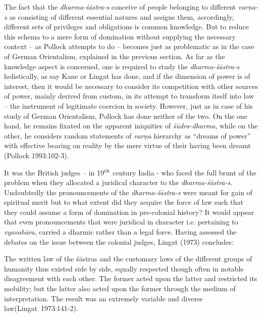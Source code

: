 The fact that the {\sl dharma-śāstra-s} conceive of people belonging to different {\sl varṇa-s} as consisting of different essential natures and assigns them, accordingly, different sets of privileges and obligations is common knowledge. But to reduce this schema to a mere form of domination without supplying the necessary context – as Pollock attempts to do – becomes just as problematic as in the case of German Orientalism, explained in the previous section. As far as the knowledge aspect is concerned, one is required to study the {\sl dharma-śāstra-s} holistically, as say Kane or Lingat has done, and if the dimension of power is of interest, then it would be necessary to consider its competition with other sources of power, mainly derived from custom, in its attempt to transform itself into law – the instrument of legitimate coercion in society. However, just as in case of his study of German Orientalism, Pollock has done neither of the two. On the one hand, he remains fixated on the apparent iniquities of {\sl śūdra-dharma}, while on the other, he considers random statements of {\sl varṇa} hierarchy as “dreams of power” with effective bearing on reality by the mere virtue of their having been dreamt (Pollock 1993:102-3).
\vskip 2pt

It was the British judges – in 19$^{\rm th}$ century India - who faced the full brunt of the problem when they allocated a juridical character to the {\sl dharma-śāstra-s}. Undoubtedly the pronouncements of the {\sl dharma-śāstra-s} were meant for gain of spiritual merit but to what extent did they acquire the force of law such that they could assume a form of domination in pre-colonial history? It would appear that even pronouncements that were juridical in character i.e. pertaining to {\sl vyavahāra}, carried a dharmic rather than a legal force. Having assessed the debates on the issue between the colonial judges, Lingat (1973) concludes:
\smallskip

\begin{myquote}
The written law of the śāstras and the customary laws of the different groups of humanity thus existed side by side, equally respected though often in notable disagreement with each other. The former acted upon the latter and restricted its mobility; but the latter also acted upon the former through the medium of interpretation. The result was an extremely variable and diverse law\hfill(Lingat~1973:141-2).
\end{myquote}
\smallskip

